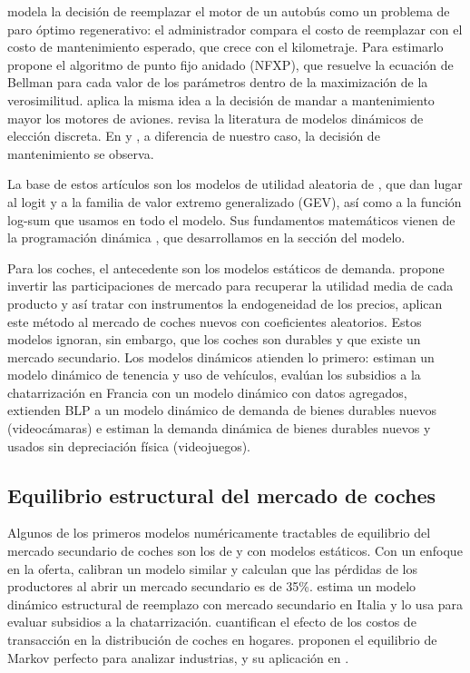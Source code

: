 \documentclass{article}
\begin{document}
\textcite{Rust1987} modela la decisión de reemplazar el motor de un autobús como un problema de paro óptimo regenerativo: el administrador compara el costo de reemplazar con el costo de mantenimiento esperado, que crece con el kilometraje. Para estimarlo propone el algoritmo de punto fijo anidado (NFXP), que resuelve la ecuación de Bellman para cada valor de los parámetros dentro de la maximización de la verosimilitud. \textcite{Kennet1994} aplica la misma idea a la decisión de mandar a mantenimiento mayor los motores de aviones. \textcite{AguirregabiriaMira2010} revisa la literatura de modelos dinámicos de elección discreta. En \textcite{Rust1987} y \textcite{Kennet1994}, a diferencia de nuestro caso, la decisión de mantenimiento se observa.

La base de estos artículos son los modelos de utilidad aleatoria de \textcite{McFadden1973,McFadden1978,McFadden1981}, que dan lugar al logit y a la familia de valor extremo generalizado (GEV), así como a la función log-sum que usamos en todo el modelo. Sus fundamentos matemáticos vienen de la programación dinámica \parencite{Bellman1957,Blackwell1965,SLP1989}, que desarrollamos en la sección del modelo.

Para los coches, el antecedente son los modelos estáticos de demanda. \textcite{Berry1994} propone invertir las participaciones de mercado para recuperar la utilidad media de cada producto y así tratar con instrumentos la endogeneidad de los precios, \textcite{BLP1995} aplican este método al mercado de coches nuevos con coeficientes aleatorios. Estos modelos ignoran, sin embargo, que los coches son durables y que existe un mercado secundario. Los modelos dinámicos atienden lo primero: \textcite{ManneringWinston1985} estiman un modelo dinámico de tenencia y uso de vehículos, \textcite{AddaCooper2000} evalúan los subsidios a la chatarrización en Francia con un modelo dinámico con datos agregados, \textcite{GowrisankaranRysman2012} extienden BLP a un modelo dinámico de demanda de bienes durables nuevos (videocámaras) e \textcite{IshiharaChing2019} estiman la demanda dinámica de bienes durables nuevos y usados sin depreciación física (videojuegos).

\subsection{Equilibrio estructural del mercado de coches}

Algunos de los primeros modelos numéricamente tractables de equilibrio del mercado secundario de coches son los de \textcite{Manski1983} y \textcite{Berkovec1985} con modelos estáticos. Con un enfoque en la oferta, \textcite{EstebanShum2007} calibran un modelo similar y calculan que las pérdidas de los productores al abrir un mercado secundario es de 35\%. \textcite{Schiraldi2011} estima un modelo dinámico estructural de reemplazo con mercado secundario en Italia y lo usa para evaluar subsidios a la chatarrización. \textcite{GavazzaLizzeriRoketskiy2014} cuantifican el efecto de los costos de transacción en la distribución de coches en hogares. \textcite{EricsonPakes1995} proponen el equilibrio de Markov perfecto para analizar industrias, y su aplicación en \textcite{GoettlerGordon2011}.
\end{document}
